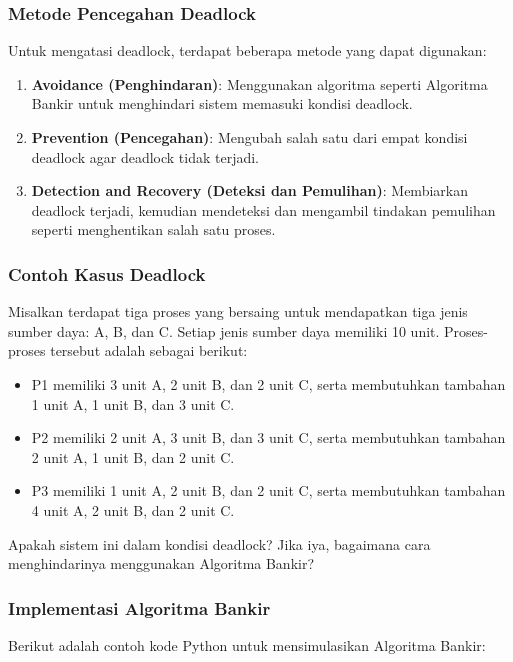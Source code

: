 \documentclass[12pt]{article}
\begin{document}
\subsubsection{Metode Pencegahan Deadlock}
Untuk mengatasi deadlock, terdapat beberapa metode yang dapat digunakan:
\begin{enumerate}
    \item \textbf{Avoidance (Penghindaran)}: Menggunakan algoritma seperti Algoritma Bankir untuk menghindari sistem memasuki kondisi deadlock.
    \item \textbf{Prevention (Pencegahan)}: Mengubah salah satu dari empat kondisi deadlock agar deadlock tidak terjadi.
    \item \textbf{Detection and Recovery (Deteksi dan Pemulihan)}: Membiarkan deadlock terjadi, kemudian mendeteksi dan mengambil tindakan pemulihan seperti menghentikan salah satu proses.
\end{enumerate}

\subsubsection{Contoh Kasus Deadlock}
Misalkan terdapat tiga proses yang bersaing untuk mendapatkan tiga jenis sumber daya: A, B, dan C. Setiap jenis sumber daya memiliki 10 unit. Proses-proses tersebut adalah sebagai berikut:

\begin{itemize}
    \item P1 memiliki 3 unit A, 2 unit B, dan 2 unit C, serta membutuhkan tambahan 1 unit A, 1 unit B, dan 3 unit C.
    \item P2 memiliki 2 unit A, 3 unit B, dan 3 unit C, serta membutuhkan tambahan 2 unit A, 1 unit B, dan 2 unit C.
    \item P3 memiliki 1 unit A, 2 unit B, dan 2 unit C, serta membutuhkan tambahan 4 unit A, 2 unit B, dan 2 unit C.
\end{itemize}

Apakah sistem ini dalam kondisi deadlock? Jika iya, bagaimana cara menghindarinya menggunakan Algoritma Bankir?

\subsubsection{Implementasi Algoritma Bankir}
Berikut adalah contoh kode Python untuk mensimulasikan Algoritma Bankir:
\end{document}
